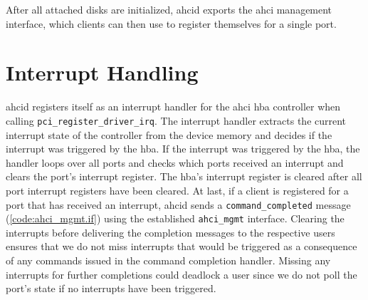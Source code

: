 After all attached disks are initialized, ahcid exports the ahci management
interface, which clients can then use to register themselves for a single port.

\section{Interrupt Handling}

ahcid registers itself as an interrupt handler for the \ac{ahci} \ac{hba}
controller when calling \lstinline+pci_register_driver_irq+. The interrupt
handler extracts the current interrupt state of the controller from the device
memory and decides if the interrupt was triggered by the \ac{hba}. If the
interrupt was triggered by the \ac{hba}, the handler loops over all ports and
checks which ports received an interrupt and clears the port's interrupt
register. The \ac{hba}'s interrupt register is cleared after all port interrupt
registers have been cleared. At last, if a client is registered for a port that
has received an interrupt, ahcid sends a \lstinline+command_completed+ message
(\autoref{code:ahci_mgmt.if}) using the established \lstinline+ahci_mgmt+
interface. Clearing the interrupts before delivering the completion messages to
the respective users ensures that we do not miss interrupts that would be
triggered as a consequence of any commands issued in the command completion
handler. Missing any interrupts for further completions could deadlock a user
since we do not poll the port's state if no interrupts have been triggered.
